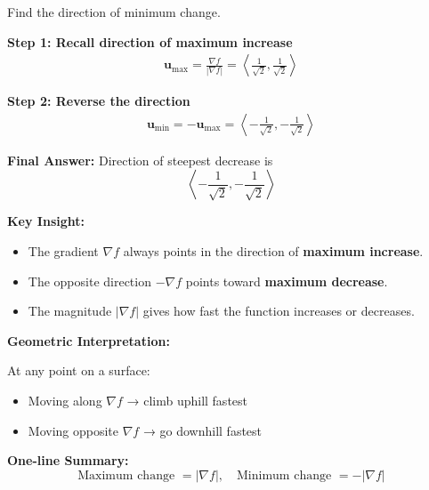 \begin{examplebox}
    Find the direction of minimum change.

    \textbf{Step 1: Recall direction of maximum increase}
    \begin{align*}
        \mathbf{u}_{\max} = \frac{\nabla f}{|\nabla f|} = \left\langle \frac{1}{\sqrt{2}}, \frac{1}{\sqrt{2}} \right\rangle
    \end{align*}

    \textbf{Step 2: Reverse the direction}
    \begin{align*}
        \mathbf{u}_{\min} = -\mathbf{u}_{\max} = \left\langle -\frac{1}{\sqrt{2}}, -\frac{1}{\sqrt{2}} \right\rangle
    \end{align*}

    \textbf{Final Answer:} Direction of steepest decrease is
    \[
        \left\langle -\frac{1}{\sqrt{2}}, -\frac{1}{\sqrt{2}} \right\rangle
    \]
\end{examplebox}

\textbf{Key Insight:}
\begin{itemize}
    \item The gradient $\nabla f$ always points in the direction of \textbf{maximum increase}.
    \item The opposite direction $-\nabla f$ points toward \textbf{maximum decrease}.
    \item The magnitude $|\nabla f|$ gives how fast the function increases or decreases.
\end{itemize}


\textbf{Geometric Interpretation:}

At any point on a surface:
\begin{itemize}
    \item Moving along $\nabla f$ → climb uphill fastest
    \item Moving opposite $\nabla f$ → go downhill fastest
\end{itemize}

\textbf{One-line Summary:}
\[
    \boxed{
        \text{Maximum change } = |\nabla f|,\quad
        \text{Minimum change } = -|\nabla f|
    }
\]